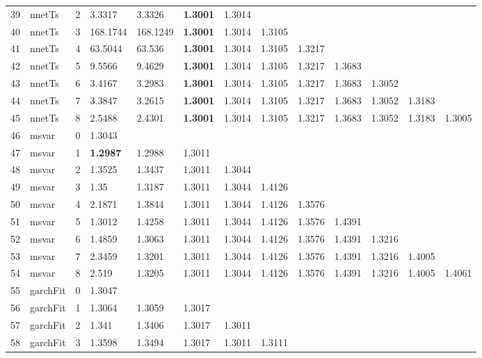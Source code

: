 \documentclass[10pt,a4paper]{article}
\begin{document}
\begin{table}[ht]
\begin{tabular}{rlrllllllllll}
  39 & nnetTs &     2 & 3.3317 & 3.3326 & \textbf{1.3001} & 1.3014 &  &  &  &  &  &  \\ 
  40 & nnetTs &     3 & 168.1744 & 168.1249 & \textbf{1.3001} & 1.3014 & 1.3105 &  &  &  &  &  \\ 
  41 & nnetTs &     4 & 63.5044 & 63.536 & \textbf{1.3001} & 1.3014 & 1.3105 & 1.3217 &  &  &  &  \\ 
  42 & nnetTs &     5 & 9.5566 & 9.4629 & \textbf{1.3001} & 1.3014 & 1.3105 & 1.3217 & 1.3683 &  &  &  \\ 
  43 & nnetTs &     6 & 3.4167 & 3.2983 & \textbf{1.3001} & 1.3014 & 1.3105 & 1.3217 & 1.3683 & 1.3052 &  &  \\ 
  44 & nnetTs &     7 & 3.3847 & 3.2615 & \textbf{1.3001} & 1.3014 & 1.3105 & 1.3217 & 1.3683 & 1.3052 & 1.3183 &  \\ 
  45 & nnetTs &     8 & 2.5488 & 2.4301 & \textbf{1.3001} & 1.3014 & 1.3105 & 1.3217 & 1.3683 & 1.3052 & 1.3183 & 1.3005 \\ 
   \hline
46 & msvar &     0 & 1.3043 &  &  &  &  &  &  &  &  &  \\ 
  47 & msvar &     1 & \textbf{1.2987} & 1.2988 & 1.3011 &  &  &  &  &  &  &  \\ 
  48 & msvar &     2 & 1.3525 & 1.3437 & 1.3011 & 1.3044 &  &  &  &  &  &  \\ 
  49 & msvar &     3 & 1.35 & 1.3187 & 1.3011 & 1.3044 & 1.4126 &  &  &  &  &  \\ 
  50 & msvar &     4 & 2.1871 & 1.3844 & 1.3011 & 1.3044 & 1.4126 & 1.3576 &  &  &  &  \\ 
  51 & msvar &     5 & 1.3012 & 1.4258 & 1.3011 & 1.3044 & 1.4126 & 1.3576 & 1.4391 &  &  &  \\ 
  52 & msvar &     6 & 1.4859 & 1.3063 & 1.3011 & 1.3044 & 1.4126 & 1.3576 & 1.4391 & 1.3216 &  &  \\ 
  53 & msvar &     7 & 2.3459 & 1.3201 & 1.3011 & 1.3044 & 1.4126 & 1.3576 & 1.4391 & 1.3216 & 1.4005 &  \\ 
  54 & msvar &     8 & 2.519 & 1.3205 & 1.3011 & 1.3044 & 1.4126 & 1.3576 & 1.4391 & 1.3216 & 1.4005 & 1.4061 \\ 
   \hline
55 & garchFit &     0 & 1.3047 &  &  &  &  &  &  &  &  &  \\ 
  56 & garchFit &     1 & 1.3064 & 1.3059 & 1.3017 &  &  &  &  &  &  &  \\ 
  57 & garchFit &     2 & 1.341 & 1.3406 & 1.3017 & 1.3011 &  &  &  &  &  &  \\ 
  58 & garchFit &     3 & 1.3598 & 1.3494 & 1.3017 & 1.3011 & 1.3111 &  &  &  &  &  \\ 

\end{tabular}
\end{table}
\end{document}
